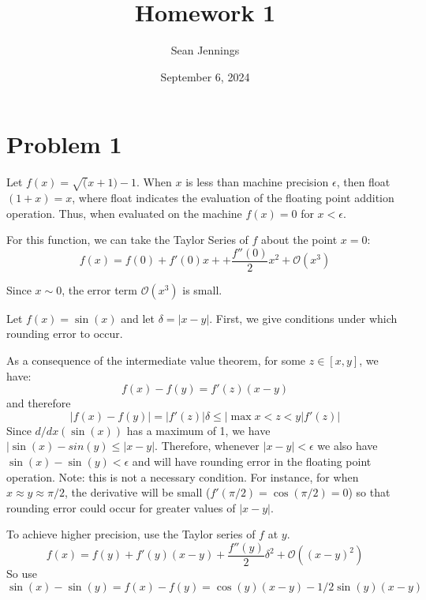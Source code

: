 \documentclass{homework}
\title{Homework 1}
\author{Sean Jennings}
\date{September 6, 2024}
\begin{document}
\maketitle

\section{Problem 1}
\begin{letterenum}
\item Let $f(x) = \sqrt(x + 1) - 1$. When $x$ is less than machine precision $\epsilon$, then
float$(1 + x) = x$, where float indicates the evaluation of the floating point
addition operation. Thus, when evaluated on the machine $f(x) = 0$ for $x < \epsilon$.

For this function, we can take the Taylor Series of $f$ about the point $x = 0$:
\begin{equation*}
    f(x) = f(0) + f'(0)x +  + \frac{f''(0)}{2} x^2 + \mathcal{O}(x^3)
\end{equation*}

Since $x \sim 0$, the error term $\mathcal{O}(x^3)$ is small.

\item Let $f(x) = \sin(x)$ and let $\delta = |x - y|$. First, we give conditions under which rounding error to occur.

As a consequence of the intermediate value theorem, for some $z\in[x,y]$, we have:
\begin{equation*}
    f(x) - f(y) = f'(z) (x - y)
\end{equation*}
and therefore
\begin{equation*}
    |f(x) - f(y)|  = |f'(z)| \delta \leq | \max{x<z<y} |f'(z)| 
\end{equation*}
Since $d/dx(\sin(x))$ has a maximum of 1, we have $|\sin(x) - sin(y) \leq |x-y|$. Therefore, whenever $|x-y| < \epsilon$
we also have $\sin(x) - \sin(y) < \epsilon$ and will have rounding error in the floating point operation.  Note:
this is not a necessary condition. For instance, for when $x\approx y \approx \pi/2$, the derivative will be small ($f'(\pi/2) = \cos(\pi/2) = 0$)
so that rounding error could occur for greater values of $|x - y|$.

To achieve higher precision, use the Taylor series of $f$ at $y$.
\begin{equation*}
    f(x) = f(y) + f'(y) (x - y)  + \frac{f''(y)}{2} \delta^2 + \mathcal{O}((x - y)^2)
\end{equation*}
So use
\begin{equation*}
    \sin(x) - \sin(y) = f(x) - f(y) = \cos(y) (x - y) - 1/2\sin(y) (x - y)
\end{equation*}


\end{letterenum}
\end{document}
